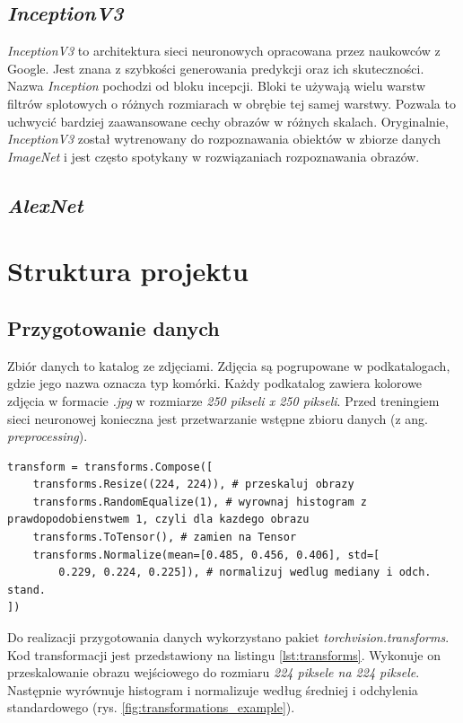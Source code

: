 \subsection{\textit{InceptionV3}}

\textit{InceptionV3} to architektura sieci neuronowych opracowana przez naukowców z Google.
Jest znana z szybkości generowania predykcji oraz ich skuteczności.
Nazwa \textit{Inception} pochodzi od bloku incepcji. Bloki te używają wielu warstw filtrów splotowych o różnych rozmiarach w obrębie tej samej warstwy. Pozwala to uchwycić bardziej zaawansowane cechy obrazów w różnych skalach.
Oryginalnie, \textit{InceptionV3} został wytrenowany do rozpoznawania obiektów w zbiorze danych \textit{ImageNet} i jest często spotykany w rozwiązaniach rozpoznawania obrazów.

\subsection{\textit{AlexNet}}

\section{Struktura projektu}

\subsection{Przygotowanie danych}

Zbiór danych to katalog ze zdjęciami. Zdjęcia są pogrupowane w podkatalogach, gdzie jego nazwa oznacza typ komórki.
Każdy podkatalog zawiera kolorowe zdjęcia w formacie \textit{.jpg} w rozmiarze \textit{250 pikseli x 250 pikseli}.
Przed treningiem sieci neuronowej konieczna jest przetwarzanie wstępne zbioru danych (z ang. \textit{preprocessing}).

\begin{lstlisting}[language=ipython,caption={Transformacja danych}, label={lst:transforms}]
transform = transforms.Compose([
    transforms.Resize((224, 224)), # przeskaluj obrazy
    transforms.RandomEqualize(1), # wyrownaj histogram z prawdopodobienstwem 1, czyli dla kazdego obrazu
    transforms.ToTensor(), # zamien na Tensor
    transforms.Normalize(mean=[0.485, 0.456, 0.406], std=[
        0.229, 0.224, 0.225]), # normalizuj wedlug mediany i odch. stand.
])
\end{lstlisting}

Do realizacji przygotowania danych wykorzystano pakiet \textit{torchvision.transforms}.
Kod transformacji jest przedstawiony na listingu \ref{lst:transforms}.
Wykonuje on przeskalowanie obrazu wejściowego do rozmiaru \textit{224 piksele na 224 piksele}.
Następnie wyrównuje histogram i normalizuje według średniej i odchylenia standardowego (rys. \ref{fig:transformations_example}).

